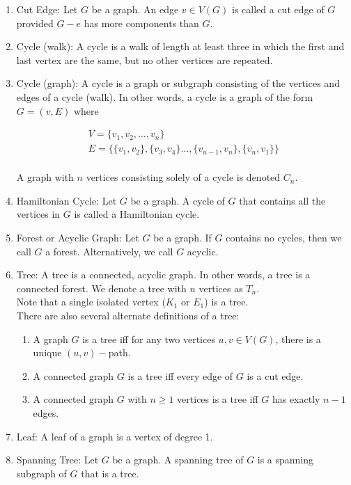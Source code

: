 \documentclass{article}
\begin{document}
\begin{enumerate}
    \item Cut Edge: Let $G$ be a graph.
    An edge $v\in V(G)$ is called a cut edge of $G$ provided $G-e$ has more components than $G$.

    \item Cycle (walk): A cycle is a walk of length at least three in which the first and last vertex are the same, but no other vertices are repeated.

    \item Cycle (graph): A cycle is a graph or subgraph consisting of the vertices and edges of a cycle (walk).
    In other words, a cycle is a graph of the form $G=(v,E)$ where

    \begin{gather*}
        V=\{v_1,v_2,\dots,v_n\} \:\: \\
        E=\{\{v_1, v_2\}, \{v_3, v_4\}\dots,\{v_{n-1}, v_n\},\{v_n, v_1\}\}\\
    \end{gather*}

    A graph with $n$ vertices consisting solely of a cycle is denoted $C_n$.

    \item Hamiltonian Cycle: Let $G$ be a graph.
    A cycle of $G$ that contains all the vertices in $G$ is called a Hamiltonian cycle.

    \item Forest or Acyclic Graph: Let $G$ be a graph.
    If $G$ contains no cycles, then we call $G$ a forest.
    Alternatively, we call $G$ acyclic.

    \item Tree: A tree is a connected, acyclic graph.
    In other words, a tree is a connected forest.
    We denote a tree with $n$ vertices as $T_n$.\\

    Note that a single isolated vertex ($K_1$ or $E_1$) is a tree.\\

    There are also several alternate definitions of a tree:

        \begin{enumerate}
            \item A graph $G$ is a tree iff for any two vertices $u,v\in V(G)$, there is a unique $(u,v)-$path.
            \item A connected graph $G$ is a tree iff every edge of $G$ is a cut edge.
            \item A connected graph $G$ with $n\geq 1$ vertices is a tree iff $G$ has exactly $n-1$ edges.
        \end{enumerate}

    \item Leaf: A leaf of a graph is a vertex of degree 1.

    \item Spanning Tree: Let $G$ be a graph.
    A spanning tree of $G$ is a spanning subgraph of $G$ that is a tree.

\end{enumerate}
\end{document}
